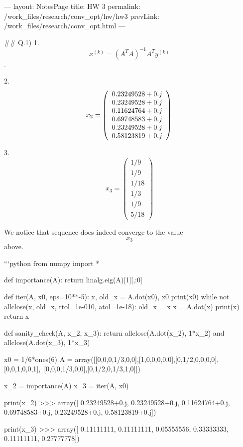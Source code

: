 ---
layout: NotesPage
title: HW 3
permalink: /work_files/research/conv_opt/hw/hw3
prevLink: /work_files/research/conv_opt.html
---



## Q.1)
1. 
    $$x^{(k)} = (A^TA)^{-1}A^Ty^{(k)}$$.

2. 
    $$x_2 = \left( \begin{array}{c} 0.23249528+0.j \\ 0.23249528+0.j \\ 0.11624764+0.j \\  0.69748583+0.j \\ 0.23249528+0.j \\  0.58123819+0.j \end{array} \right) \\ \\$$


3. 
    $$x_3 = \left( \begin{array}{c} 1/9 \\ 1/9 \\ 1/18 \\ 1/3 \\ 1/9 \\  5/18 \end{array} \right)$$

    We notice that sequence does indeed converge to the value $$x_3$$ above.  


    ```python
        from numpy import *

        def importance(A):
            return linalg.eig(A)[1][,:0]

        def iter(A, x0, eps=10**-5):
            x, old_x = A.dot(x0), x0
            print(x0)
            while not allclose(x, old_x, rtol=1e-010, atol=1e-18):
                old_x = x
                x = A.dot(x)
                print(x)
            return x

        def sanity_check(A, x_2, x_3):
            return allclose(A.dot(x_2), 1*x_2) and allclose(A.dot(x_3), 1*x_3)

        x0 = 1/6*ones(6)
        A = array([[0,0,0,1/3,0,0],[1,0,0,0,0,0],[0,1/2,0,0,0,0],[0,0,1,0,0,1],\
        [0,0,0,1/3,0,0],[0,1/2,0,1/3,1,0]])

        x_2 = importance(A)
        x_3 = iter(A, x0)

        print(x_2)
    >>> array([ 0.23249528+0.j,  0.23249528+0.j,  0.11624764+0.j,  0.69748583+0.j,
        0.23249528+0.j,  0.58123819+0.j])

        print(x_3)
    >>> array([ 0.11111111,  0.11111111,  0.05555556,  0.33333333,  0.11111111,
        0.27777778])

